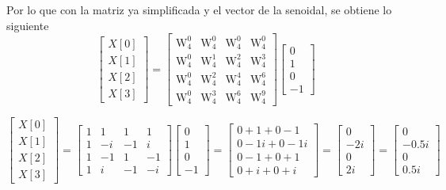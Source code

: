 \documentclass[12pt]{article}
\begin{document}
Por lo que con la matriz ya simplificada y el vector de la senoidal, se obtiene lo siguiente
$$
\begin{bmatrix}
X[0] \\
X[1] \\
X[2] \\
X[3]
\end{bmatrix}
=
\begin{bmatrix}       
\text{W}_4^{0} & \text{W}_4^{0} & \text{W}_4^{0} & \text{W}_4^{0} \\
\text{W}_4^{0} & \text{W}_4^{1} & \text{W}_4^{2} & \text{W}_4^{3} \\
\text{W}_4^{0} & \text{W}_4^{2} & \text{W}_4^{4} & \text{W}_4^{6} \\
\text{W}_4^{0} & \text{W}_4^{3} & \text{W}_4^{6} & \text{W}_4^{9}
\end{bmatrix}
\begin{bmatrix}
0 \\
1 \\
0 \\
-1
\end{bmatrix}
$$

$$
\begin{bmatrix}
X[0] \\
X[1] \\
X[2] \\
X[3]
\end{bmatrix}
=
\begin{bmatrix}       
1 & 1 & 1 & 1 \\
1 & -i & -1 & i \\
1 & -1 & 1 & -1 \\
1 & i & -1 & -i
\end{bmatrix}
\begin{bmatrix}
0 \\
1 \\
0 \\
-1
\end{bmatrix}
=
\begin{bmatrix}       
0 + 1  + 0 -1 \\
0 - 1i + 0 - 1i \\
0 - 1 + 0 + 1 \\
0 + i + 0 + i
\end{bmatrix}=
\begin{bmatrix}       
0 \\
-2i\\
0 \\
2i
\end{bmatrix}
= 
\begin{bmatrix}
0 \\
-0.5i\\
0 \\
0.5i
\end{bmatrix}
$$
\end{document}
